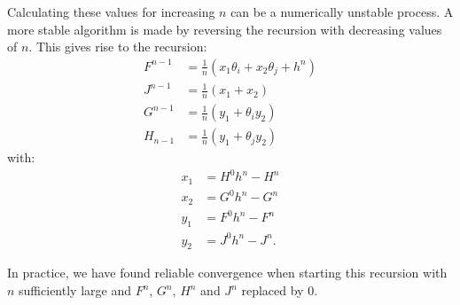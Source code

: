Calculating these values for increasing $n$ can be a numerically unstable process. A more stable algorithm is made by reversing the recursion with decreasing values of $n$. This gives rise to the recursion:
\begin{align*}
  F^{n-1} & = \frac{1}{n}\left( x_1 \theta_i + x_2 \theta_j + h^n \right) \\
  J^{n-1} & = \frac{1}{n}\left( x_1  + x_2\right)                         \\
  G^{n-1} & = \frac{1}{n}\left( y_1  + \theta_i y_2\right)                \\
  H_{n-1} & = \frac{1}{n}\left( y_1  + \theta_j y_2\right)
\end{align*}
with:
\begin{align*}
  x_1 & = H^{0} h^n - H^n             \\
  x_2 & = G^0 h^n - G^n               \\
  y_1 & = F^{0} h^n - F^{n}           \\
  y_2 & = J^{0} h^n - J^{n}  \text{.}
\end{align*}

In practice, we have found reliable convergence when starting this recursion with $n$ sufficiently large and $F^n$, $G^n$, $H^n$ and $J^n$ replaced by $0$.

